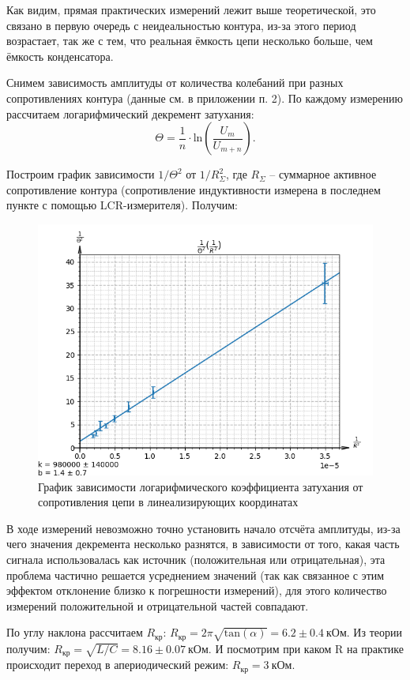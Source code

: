 \documentclass[a4paper,12pt]{extarticle}
\begin{document}
Как видим, прямая практических измерений лежит выше теоретической, это связано в первую очередь с неидеальностью контура, из-за этого период возрастает, так же с тем, что реальная ёмкость цепи несколько больше, чем ёмкость конденсатора.

Снимем зависимость амплитуды от количества колебаний при разных сопротивлениях контура (данные см. в приложении п. 2). По каждому измерению рассчитаем логарифмический декремент затухания:
\begin{equation}
    \Theta = \frac{1}{n} \cdot \text{ln}(\frac{U_m}{U_{m+n}}).
\end{equation}

Построим график зависимости $1/\Theta^2$ от $1/R_\Sigma ^2$, где $R_\Sigma$ -- суммарное активное сопротивление контура (сопротивление индуктивности измерена в последнем пункте с помощью LCR-измерителя). Получим:

\begin{figure}[h!]
    \centering
    \includegraphics[width=0.8\linewidth]{th(r).png}
    \caption{График зависимости логарифмического коэффициента затухания от сопротивления цепи в линеализирующих координатах}
\end{figure}
В ходе измерений невозможно точно установить начало отсчёта амплитуды, из-за чего значения декремента несколько разнятся, в зависимости от того, какая часть сигнала использовалась как источник (положительная или отрицательная), эта проблема частично решается усреднением значений (так как связанное с этим эффектом отклонение близко к погрешности измерений), для этого количество измерений положительной и отрицательной частей совпадают.

По углу наклона рассчитаем $R_\text{кр}$: $R_\text{кр} = 2 \pi \sqrt{\text{tan}(\alpha)} = 6.2 \pm 0.4 \ \text{кОм}.$ Из теории получим: $R_\text{кр} = \sqrt{L/C} = 8.16 \pm 0.07 \ \text{кОм}.$ И посмотрим при каком R на практике происходит переход в апериодический режим:
$R_\text{кр} = 3 \ \text{кОм}.$
\end{document}
